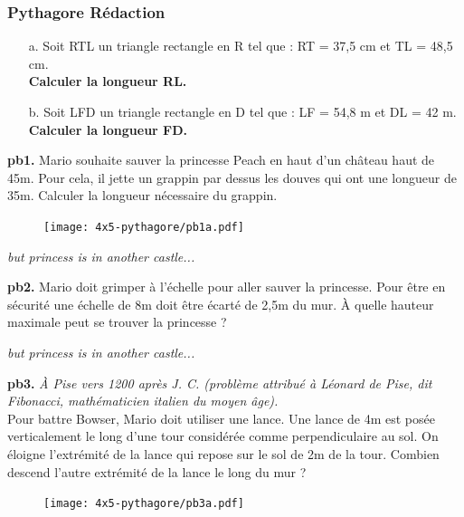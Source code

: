 \subsubsection*{Pythagore Rédaction}

\begin{multicols}{2}
\begin{enumerate}
  \item[a.]Soit RTL un triangle rectangle en R tel que : RT = 37,5 cm et TL = 48,5 cm. \\
  \textbf{Calculer la longueur RL.}

  \item[b.]Soit LFD un triangle rectangle en D tel que : LF = 54,8 m et DL = 42 m. \\
  \textbf{Calculer la longueur FD.}

\end{enumerate}
\end{multicols}

\Pointilles[13]

\begin{minipage}[t]{0.65\textwidth}
  \textbf{pb1.} Mario souhaite sauver la princesse Peach en haut d'un château haut de 45m. Pour cela, il jette un grappin par dessus les douves qui ont une longueur de 35m. Calculer la longueur nécessaire du grappin.
  
  \Pointilles[5]
  \end{minipage}
  \begin{minipage}[t]{0.35\textwidth}
  \begin{figure}[H]
    \centering
    \texttt{[image: 4x5-pythagore/pb1a.pdf]}
  \end{figure}
\end{minipage}

\newpage

\textit{but princess is in another castle...}

\textbf{pb2.} Mario doit grimper à l'échelle pour aller sauver la princesse. Pour être en sécurité une échelle de 8m doit être écarté de 2,5m du mur. À quelle hauteur maximale peut se trouver la princesse ? \\
\Pointilles[5]

\begin{minipage}[t]{0.65\textwidth}
  \textit{but princess is in another castle...}

  \textbf{pb3.}  \textit{À Pise vers 1200 après J. C. (problème attribué à Léonard de Pise, dit Fibonacci, mathématicien italien   du moyen âge).} \\
  Pour battre Bowser, Mario doit utiliser une lance. Une lance de 4m est posée verticalement le long d’une tour considérée comme perpendiculaire au sol. On éloigne l’extrémité de la lance qui repose sur le sol de 2m de la tour. Combien descend l’autre extrémité de la lance le long du mur ?
  \Pointilles[6]
  \end{minipage}
  \begin{minipage}[t]{0.35\textwidth}
  \begin{figure}[H]
    \centering
    \texttt{[image: 4x5-pythagore/pb3a.pdf]}
  \end{figure}
\end{minipage}

